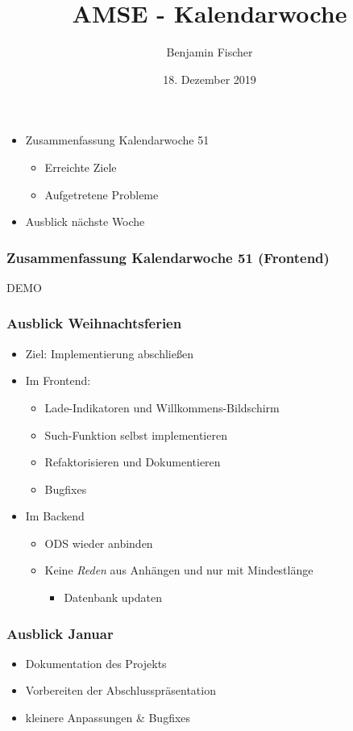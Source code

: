 \documentclass{beamer}
\title{AMSE - Kalendarwoche \cw{}}
\date{18. Dezember 2019}
\author{Benjamin Fischer}
\institute{benjamin.f.fischer@fau.de}
\newcommand{\cw}{51}
\begin{document}
  \maketitle

  \begin{frame}
    \begin{itemize}
      \item Zusammenfassung Kalendarwoche \cw{}
      \begin{itemize}
        \item Erreichte Ziele
        \item Aufgetretene Probleme
      \end{itemize}
      \item Ausblick nächste Woche
    \end{itemize}
  \end{frame}


  \begin{frame}
    \frametitle{Zusammenfassung Kalendarwoche \cw{} (Frontend)}
    \centering
    \begin{LARGE}
      DEMO
    \end{LARGE}
  \end{frame}

  \begin{frame}
    \frametitle{Ausblick Weihnachtsferien}
    \begin{itemize}
      \item Ziel: Implementierung abschließen
      \item Im Frontend:
      \begin{itemize}
        \item Lade-Indikatoren und Willkommens-Bildschirm
        \item Such-Funktion selbst implementieren
        \item Refaktorisieren und Dokumentieren
        \item Bugfixes
      \end{itemize}
      \item Im Backend
      \begin{itemize}
        \item ODS wieder anbinden
        \item Keine \textit{Reden} aus Anhängen und nur mit Mindestlänge
        \begin{itemize}
          \item Datenbank updaten
        \end{itemize}
      \end{itemize}
    \end{itemize}
  \end{frame}

  \begin{frame}
    \frametitle{Ausblick Januar}
    \begin{itemize}
      \item Dokumentation des Projekts
      \item Vorbereiten der Abschlusspräsentation
      \item kleinere Anpassungen \& Bugfixes
    \end{itemize}
  \end{frame}
\end{document}
